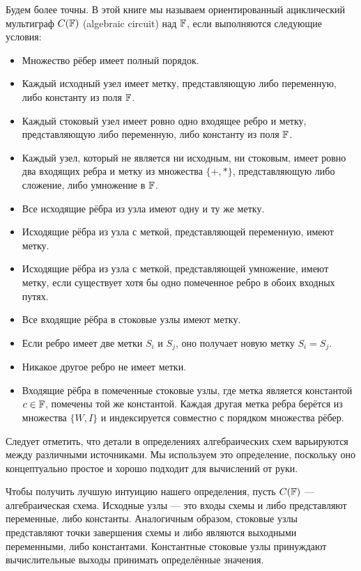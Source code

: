 Будем более точны. В этой книге мы называем ориентированный ациклический мультиграф $C(\mathbb{F})$  (algebraic circuit) над $\mathbb{F}$, если выполняются следующие условия:

\begin{itemize}
\label{def:algebraic-circuit}
\item Множество рёбер имеет полный порядок.
\item Каждый исходный узел имеет метку, представляющую либо переменную, либо константу из поля $\mathbb{F}$.
\item Каждый стоковый узел имеет ровно одно входящее ребро и метку, представляющую либо переменную, либо константу из поля $\mathbb{F}$.
\item Каждый узел, который не является ни исходным, ни стоковым, имеет ровно два входящих ребра и метку из множества $\{+,*\}$, представляющую либо сложение, либо умножение в $\mathbb{F}$.
\item Все исходящие рёбра из узла имеют одну и ту же метку.
\item Исходящие рёбра из узла с меткой, представляющей переменную, имеют метку.
\item Исходящие рёбра из узла с меткой, представляющей умножение, имеют метку, если существует хотя бы одно помеченное ребро в обоих входных путях.
\item Все входящие рёбра в стоковые узлы имеют метку.
\item Если ребро имеет две метки $S_i$ и $S_j$, оно получает новую метку $S_i = S_j$.
\item Никакое другое ребро не имеет метки.
\item Входящие рёбра в помеченные стоковые узлы, где метка является константой $c\in\mathbb{F}$, помечены той же константой. Каждая другая метка ребра берётся из множества $\{W,I\}$ и индексируется совместно с порядком множества рёбер. 
\end{itemize} 

Следует отметить, что детали в определениях алгебраических схем варьируются между различными источниками. Мы используем это определение, поскольку оно концептуально простое и хорошо подходит для вычислений от руки.

Чтобы получить лучшую интуицию нашего определения, пусть $C(\mathbb{F})$ — алгебраическая схема. Исходные узлы — это входы схемы и либо представляют переменные, либо константы. Аналогичным образом, стоковые узлы представляют точки завершения схемы и либо являются выходными переменными, либо константами. Константные стоковые узлы принуждают вычислительные выходы принимать определённые значения.

